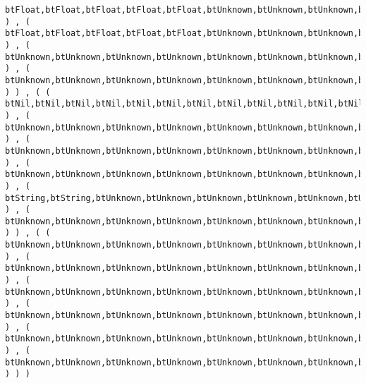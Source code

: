 \begin{verbatim}
btFloat,btFloat,btFloat,btFloat,btFloat,btUnknown,btUnknown,btUnknown,btUnknown,btUnknown,btUnknown,btUnknown,btUnknown,btUnknown,btUnknown,btInteger,btUnknown ) , ( btFloat,btFloat,btFloat,btFloat,btFloat,btUnknown,btUnknown,btUnknown,btUnknown,btUnknown,btUnknown,btUnknown,btFloat,btUnknown,btUnknown,btInteger,btFloat ) , ( btUnknown,btUnknown,btUnknown,btUnknown,btUnknown,btUnknown,btUnknown,btUnknown,btUnknown,btUnknown,btUnknown,btUnknown,btUnknown,btUnknown,btUnknown,btUnknown,btUnknown ) , ( btUnknown,btUnknown,btUnknown,btUnknown,btUnknown,btUnknown,btUnknown,btUnknown,btUnknown,btUnknown,btUnknown,btUnknown,btUnknown,btUnknown,btUnknown,btUnknown,btUnknown ) ) , ( ( btNil,btNil,btNil,btNil,btNil,btNil,btNil,btNil,btNil,btNil,btNil,btNil,btNil,btNil,btNil,btNil,btNil ) , ( btUnknown,btUnknown,btUnknown,btUnknown,btUnknown,btUnknown,btUnknown,btUnknown,btUnknown,btUnknown,btUnknown,btUnknown,btUnknown,btUnknown,btUnknown,btUnknown,btUnknown ) , ( btUnknown,btUnknown,btUnknown,btUnknown,btUnknown,btUnknown,btUnknown,btUnknown,btUnknown,btUnknown,btUnknown,btUnknown,btUnknown,btUnknown,btUnknown,btUnknown,btUnknown ) , ( btUnknown,btUnknown,btUnknown,btUnknown,btUnknown,btUnknown,btUnknown,btUnknown,btUnknown,btUnknown,btUnknown,btUnknown,btUnknown,btUnknown,btUnknown,btUnknown,btUnknown ) , ( btString,btString,btUnknown,btUnknown,btUnknown,btUnknown,btUnknown,btUnknown,btUnknown,btUnknown,btUnknown,btUnknown,btUnknown,btUnknown,btUnknown,btInteger,btUnknown ) , ( btUnknown,btUnknown,btUnknown,btUnknown,btUnknown,btUnknown,btUnknown,btUnknown,btUnknown,btUnknown,btUnknown,btUnknown,btUnknown,btUnknown,btUnknown,btUnknown,btUnknown ) ) , ( ( btUnknown,btUnknown,btUnknown,btUnknown,btUnknown,btUnknown,btUnknown,btUnknown,btUnknown,btUnknown,btUnknown,btUnknown,btUnknown,btUnknown,btUnknown,btUnknown,btUnknown ) , ( btUnknown,btUnknown,btUnknown,btUnknown,btUnknown,btUnknown,btUnknown,btUnknown,btUnknown,btUnknown,btUnknown,btUnknown,btUnknown,btUnknown,btUnknown,btUnknown,btUnknown ) , ( btUnknown,btUnknown,btUnknown,btUnknown,btUnknown,btUnknown,btUnknown,btUnknown,btUnknown,btUnknown,btUnknown,btUnknown,btUnknown,btUnknown,btUnknown,btUnknown,btUnknown ) , ( btUnknown,btUnknown,btUnknown,btUnknown,btUnknown,btUnknown,btUnknown,btUnknown,btUnknown,btUnknown,btUnknown,btUnknown,btUnknown,btUnknown,btUnknown,btUnknown,btUnknown ) , ( btUnknown,btUnknown,btUnknown,btUnknown,btUnknown,btUnknown,btUnknown,btUnknown,btUnknown,btUnknown,btUnknown,btUnknown,btUnknown,btUnknown,btUnknown,btUnknown,btUnknown ) , ( btUnknown,btUnknown,btUnknown,btUnknown,btUnknown,btUnknown,btUnknown,btUnknown,btUnknown,btUnknown,btUnknown,btUnknown,btUnknown,btUnknown,btUnknown,btUnknown,btUnknown ) ) )
\end{verbatim}
\label{thoriumcore:thorium:thoriumtypeoperatorresults}


